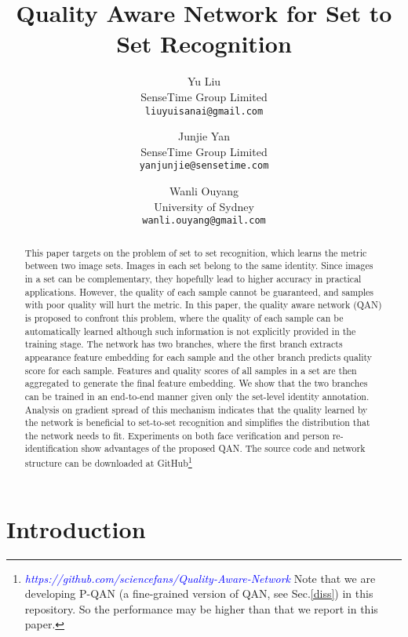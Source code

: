 \documentclass[10pt,twocolumn,letterpaper]{article}
\begin{document}
\title{Quality Aware Network for Set to Set Recognition}

\author{Yu Liu\\
SenseTime Group Limited\\
{\tt\small liuyuisanai@gmail.com}
\and
Junjie Yan\\
SenseTime Group Limited\\
{\tt\small yanjunjie@sensetime.com}
\and
Wanli Ouyang\\
University of Sydney\\
{\tt\small wanli.ouyang@gmail.com}
}

\maketitle
\begin{abstract}
This paper targets on the problem of set to set recognition, which learns the metric between two image sets.  Images in each set belong to the same identity.  Since images in a set can be complementary, they hopefully lead to higher accuracy in practical applications. However, the quality of each sample cannot be guaranteed, and samples with poor quality will hurt the metric. In this paper, the quality aware network (QAN) is proposed to confront this problem, where the quality of each sample can be automatically learned although such information is not explicitly provided in the training stage. The network has two branches, where the first branch extracts appearance feature embedding for each sample and the other branch predicts quality score for each sample. Features and quality scores of all samples in a set are then aggregated to generate the final feature embedding. We show that the two branches can be trained in an end-to-end manner given only the set-level identity annotation. Analysis on gradient spread of this mechanism indicates that the quality learned by the network is beneficial to set-to-set recognition and simplifies the distribution that the network needs to fit. Experiments on both face verification and person re-identification show advantages of the proposed QAN. The source code and network structure can be downloaded at GitHub\footnote{ \textcolor{blue}{\textit{https://github.com/sciencefans/Quality-Aware-Network}} Note that we are developing P-QAN (a fine-grained version of QAN, see Sec.\ref{diss}) in this repository. So the performance may be higher than that we report in this paper.}
\end{abstract}
 
\section{Introduction}
\end{document}
